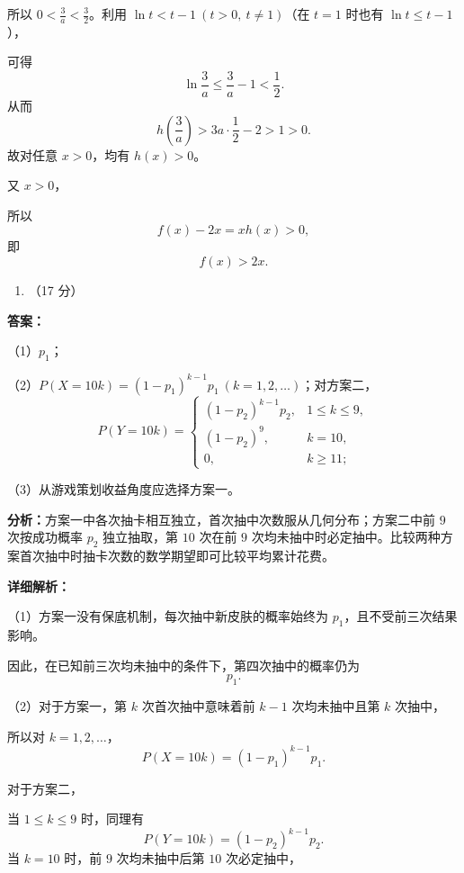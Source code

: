 \documentclass[UTF8,12pt,a4paper]{ctexart}
\renewcommand{\labelenumi}{\arabic{enumi}.}
\providecommand{\tightlist}{%
  \setlength{\itemsep}{0pt}\setlength{\parskip}{0pt}}
\begin{document}
所以 \(0<\frac3a<\frac32\)。利用 \(\ln t<t-1\ (t>0,\ t\ne1)\)（在 \(t=1\) 时也有 \(\ln t\le t-1\)），

可得
\[
   \ln\frac3a\leqslant\frac3a-1<\frac12.
   \]
从而
\[
   h\left(\frac3a\right)
   >3a\cdot\frac12-2
   >1>0.
   \]
故对任意 \(x>0\)，均有 \(h(x)>0\)。

又 \(x>0\)，

所以
\[
   f(x)-2x=xh(x)>0,
   \]
即
\[
   \boxed{f(x)>2x}.
   \]

\begin{enumerate}
\def\labelenumi{\arabic{enumi}.}
\setcounter{enumi}{18}
\tightlist
\item
  （17 分）
\end{enumerate}

\textbf{答案：}
\par\smallskip\noindent（1）\(p_1\)；
\par\smallskip\noindent（2）\(P(X=10k)=(1-p_1)^{k-1}p_1\ (k=1,2,\ldots)\)；对方案二，
\[
   P(Y=10k)=
   \begin{cases}
   (1-p_2)^{k-1}p_2,&1\le k\le9,\\
   (1-p_2)^9,&k=10,\\
   0,&k\ge11;
   \end{cases}
   \]

\par\smallskip\noindent（3）从游戏策划收益角度应选择方案一。

\textbf{分析：}方案一中各次抽卡相互独立，首次抽中次数服从几何分布；方案二中前 \(9\) 次按成功概率 \(p_2\) 独立抽取，第 \(10\) 次在前 \(9\) 次均未抽中时必定抽中。比较两种方案首次抽中时抽卡次数的数学期望即可比较平均累计花费。

\textbf{详细解析：}


\par\smallskip\noindent（1）方案一没有保底机制，每次抽中新皮肤的概率始终为 \(p_1\)，且不受前三次结果影响。

因此，在已知前三次均未抽中的条件下，第四次抽中的概率仍为
\[
   \boxed{p_1}.
   \]


\par\smallskip\noindent（2）对于方案一，第 \(k\) 次首次抽中意味着前 \(k-1\) 次均未抽中且第 \(k\) 次抽中，

所以对 \(k=1,2,\ldots\)，
\[
   \boxed{P(X=10k)=(1-p_1)^{k-1}p_1}.
   \]

对于方案二，

当 \(1\le k\le9\) 时，同理有
\[
   P(Y=10k)=(1-p_2)^{k-1}p_2.
   \]
当 \(k=10\) 时，前 \(9\) 次均未抽中后第 \(10\) 次必定抽中，
\end{document}
